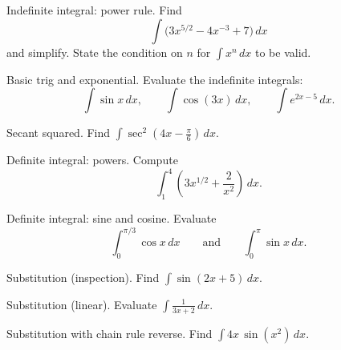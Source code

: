 \documentclass[11pt]{article}
\def\textbf#1{#1}%
\newcounter{question}
\begin{document}
\begin{question}
\textbf{Indefinite integral: power rule.}
Find
\[
\int \bigl(3x^{5/2}-4x^{-3}+7\bigr)\,dx
\]
and simplify. State the condition on $n$ for $\int x^n\,dx$ to be valid.
\end{question}

\begin{question}
\textbf{Basic trig and exponential.}
Evaluate the indefinite integrals:
\[
\int \sin x\,dx,\qquad
\int \cos(3x)\,dx,\qquad
\int e^{2x-5}\,dx .
\]
\end{question}

\begin{question}
\textbf{Secant squared.}
Find $\displaystyle \int \sec^{2}(4x-\tfrac{\pi}{6})\,dx$.
\end{question}

\begin{question}
\textbf{Definite integral: powers.}
Compute
\[
\int_{1}^{4}\!\left(3x^{1/2}+\frac{2}{x^{2}}\right)\,dx .
\]
\end{question}

\begin{question}
\textbf{Definite integral: sine and cosine.}
Evaluate
\[
\int_{0}^{\pi/3} \cos x\,dx
\qquad\text{and}\qquad
\int_{0}^{\pi} \sin x\,dx .
\]
\end{question}

\begin{question}
\textbf{Substitution (inspection).}
Find $\displaystyle \int \sin(2x+5)\,dx$.
\end{question}

\begin{question}
\textbf{Substitution (linear).}
Evaluate $\displaystyle \int \frac{1}{3x+2}\,dx$.
\end{question}

\begin{question}
\textbf{Substitution with chain rule reverse.}
Find $\displaystyle \int 4x\,\sin(x^{2})\,dx$.
\end{question}
\end{document}
